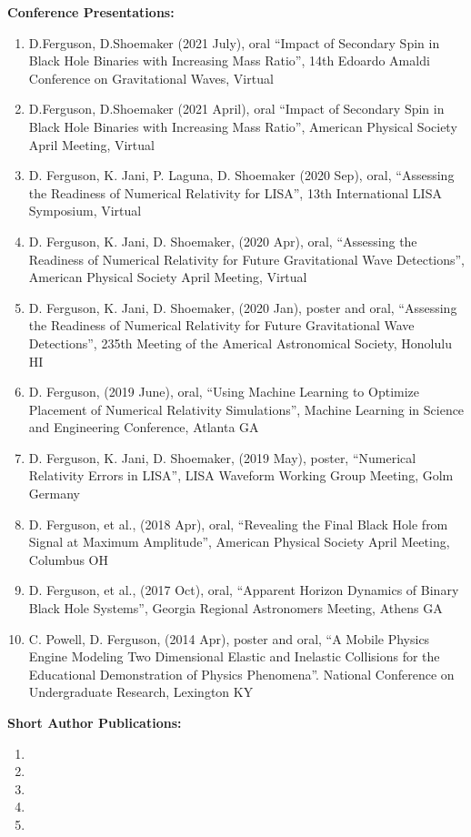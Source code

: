 \documentclass[11pt]{article}
\newcounter{papers}
\begin{document}
\begin{flushleft}
  \textbf{Conference Presentations:}
  \begin{enumerate}
  \item D.Ferguson, D.Shoemaker (2021 July), oral ``Impact of Secondary Spin in Black Hole Binaries with Increasing Mass Ratio'', 14th Edoardo Amaldi Conference on Gravitational Waves, Virtual
  \item D.Ferguson,  D.Shoemaker (2021 April),  oral ``Impact of Secondary Spin in Black Hole Binaries with Increasing Mass Ratio'',  American Physical Society April Meeting, Virtual
  \item D. Ferguson, K. Jani, P. Laguna, D. Shoemaker (2020 Sep), oral, ``Assessing the Readiness of Numerical Relativity for LISA'', 13th International LISA Symposium, Virtual
  \item D. Ferguson, K. Jani, D. Shoemaker, (2020 Apr), oral, ``Assessing the Readiness of Numerical Relativity for Future Gravitational Wave Detections'', American Physical Society April Meeting, Virtual
  \item D. Ferguson, K. Jani, D. Shoemaker, (2020 Jan), poster and oral, ``Assessing the Readiness of Numerical Relativity for Future Gravitational Wave Detections'', 235th Meeting of the Americal Astronomical Society, Honolulu HI
  \item D. Ferguson, (2019 June), oral, ``Using Machine Learning to Optimize Placement of Numerical Relativity Simulations'', Machine Learning in Science and Engineering Conference, Atlanta GA
  \item D. Ferguson, K. Jani, D. Shoemaker, (2019 May), poster, ``Numerical Relativity Errors in LISA'', LISA Waveform Working Group Meeting, Golm Germany
  \item D. Ferguson, et al., (2018 Apr), oral, ``Revealing the Final Black Hole from Signal at Maximum Amplitude'', American Physical Society April Meeting, Columbus OH
  \item D. Ferguson, et al., (2017 Oct), oral, ``Apparent Horizon Dynamics of Binary Black Hole Systems'', Georgia Regional Astronomers Meeting, Athens GA
  \item C. Powell, D. Ferguson, (2014 Apr), poster and oral, ``A Mobile Physics Engine Modeling Two Dimensional Elastic and Inelastic Collisions for the Educational Demonstration of Physics Phenomena''. National Conference on Undergraduate Research, Lexington KY  
  \end{enumerate} 

  \textbf{Short Author Publications:}
  \begin{enumerate}  
	\item {}
    \item {}
    \item {}
    \item {}
    \item {}
    \setcounter{papers}{\value{enumi}}
  \end{enumerate}
  

\end{flushleft}
\end{document}
